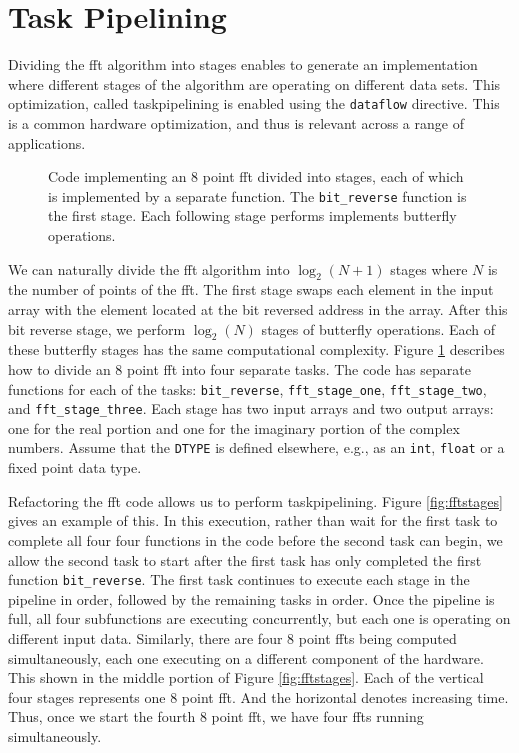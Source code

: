 \section{Task Pipelining}
\label{sec:fft_task_pipelining}

Dividing the \gls{fft} algorithm into stages enables \VHLS to generate an implementation where different stages of the algorithm are operating on different data sets. This optimization, called \gls{taskpipelining} is enabled using the \lstinline{dataflow} directive. This is a common hardware optimization, and thus is relevant across a range of applications.

\begin{figure}

\caption{Code implementing an 8 point \gls{fft} divided into stages, each of which is implemented by a separate function. The \lstinline{bit_reverse} function is the first stage. Each following stage performs implements butterfly operations. }
\label{fig:fft_stages_code}
\end{figure}

We can naturally divide the \gls{fft} algorithm into $\log_2(N+1)$ stages where $N$ is the number of points of the \gls{fft}.  The first stage swaps each element in the input array with the element located at the bit reversed address in the array. After this bit reverse stage, we perform $\log_2(N)$ stages of butterfly operations. Each of these butterfly stages has the same computational complexity.  Figure \ref{fig:fft_stages_code} describes how to divide an 8 point \gls{fft} into four separate tasks. The code has separate functions for each of the tasks: \lstinline{bit_reverse}, \lstinline{fft_stage_one}, \lstinline{fft_stage_two}, and \lstinline{fft_stage_three}. Each stage has two input arrays and two output arrays: one for the real portion and one for the imaginary portion of the complex numbers. Assume that the \lstinline{DTYPE} is defined elsewhere, e.g., as an \lstinline{int}, \lstinline{float} or a fixed point data type.

Refactoring the \gls{fft} code allows us to perform \gls{taskpipelining}. Figure \ref{fig:fftstages} gives an example of this. In this execution, rather than wait for the first task to complete all four four functions in the code before the second task can begin, we allow the second task to start after the first task has only completed the first function \lstinline{bit_reverse}. The first task continues to execute each stage in the pipeline in order, followed by the remaining tasks in order.  Once the pipeline is full, all four subfunctions are executing concurrently, but each one is operating on different input data. Similarly, there are four 8 point \gls{fft}s being computed simultaneously, each one executing on a different component of the hardware. This shown in the middle portion of Figure \ref{fig:fftstages}. Each of the vertical four stages represents one 8 point \gls{fft}. And the horizontal denotes increasing time. Thus, once we start the fourth 8 point \gls{fft}, we have four \gls{fft}s running simultaneously. 

